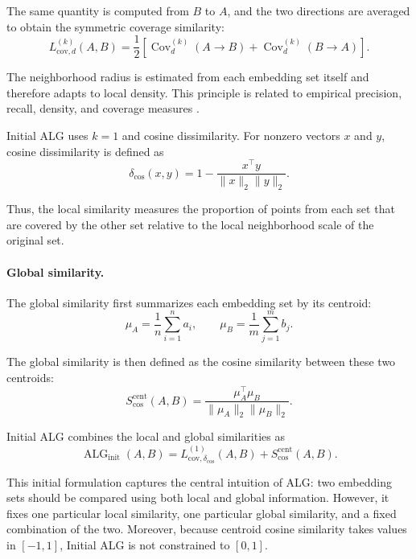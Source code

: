 \documentclass[preprint,12pt]{elsarticle}
\newcommand{\ALG}{\operatorname{ALG}}
\newcommand{\Cov}{\operatorname{Cov}}
\newcommand{\deltacos}{\delta_{\mathrm{cos}}}
\begin{document}
The same quantity is computed from $B$ to $A$, and the two directions are
averaged to obtain the symmetric coverage similarity:
\begin{equation}
L_{\mathrm{cov},d}^{(k)}(A,B)
=
\frac{1}{2}
\left[
\Cov_d^{(k)}(A\!\to\!B)
+
\Cov_d^{(k)}(B\!\to\!A)
\right].
\label{eq:coverage}
\end{equation}

The neighborhood radius is estimated from each embedding set itself and
therefore adapts to local density. This principle is related to empirical
precision, recall, density, and coverage measures
\cite{kynkaanniemi2019precision,naeem2020reliable,cheema2023prc}.

Initial ALG uses $k=1$ and cosine dissimilarity. For nonzero vectors $x$ and
$y$, cosine dissimilarity is defined as
\begin{equation}
\deltacos(x,y)
=
1-
\frac{x^\top y}
{\lVert x\rVert_2\lVert y\rVert_2}.
\label{eq:cosine-dissimilarity}
\end{equation}

Thus, the local similarity measures the proportion of points from each set
that are covered by the other set relative to the local neighborhood scale of
the original set.

\paragraph{Global similarity.}

The global similarity first summarizes each embedding set by its centroid:
\begin{equation}
\mu_A
=
\frac{1}{n}\sum_{i=1}^{n}a_i,
\qquad
\mu_B
=
\frac{1}{m}\sum_{j=1}^{m}b_j.
\label{eq:centroids}
\end{equation}

The global similarity is then defined as the cosine similarity between these
two centroids:
\begin{equation}
S_{\mathrm{cos}}^{\mathrm{cent}}(A,B)
=
\frac{\mu_A^\top\mu_B}
{\lVert\mu_A\rVert_2\lVert\mu_B\rVert_2}.
\label{eq:centroid-cosine}
\end{equation}

Initial ALG combines the local and global similarities as
\begin{equation}
\ALG_{\mathrm{init}}(A,B)
=
L_{\mathrm{cov},\deltacos}^{(1)}(A,B)
+
S_{\mathrm{cos}}^{\mathrm{cent}}(A,B).
\label{eq:initial-alg}
\end{equation}

This initial formulation captures the central intuition of ALG: two embedding
sets should be compared using both local and global information. However, it
fixes one particular local similarity, one particular global similarity, and
a fixed combination of the two. Moreover, because centroid cosine similarity
takes values in $[-1,1]$, Initial ALG is not constrained to $[0,1]$.
\end{document}
